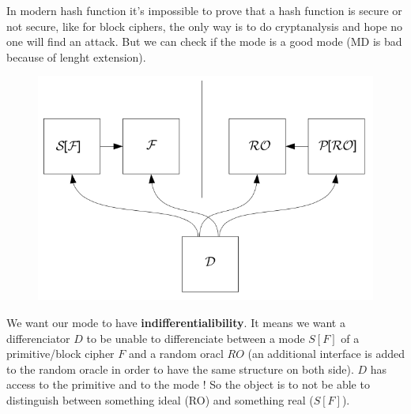 \documentclass[11pt,a4paper]{report}
\begin{document}
In modern hash function it's impossible to prove that a hash function is secure or not secure, like for block ciphers, the only way is to do cryptanalysis and hope no one will find an attack. But we can check if the mode is a good mode (MD is bad because of lenght extension).\\
\begin{figure}
\vspace{-8mm}
\includegraphics[scale=0.4]{img/img25.png}
\end{figure}
We want our mode to have \textbf{indifferentialibility}. It means we want a differenciator $D$ to be unable to differenciate between a mode $S[F]$ of a primitive/block cipher $F$ and a random oracl $RO$ (an additional interface is added to the random oracle in order to have the same structure on both side). $D$ has access to the primitive and to the mode ! So the object is to not be able to distinguish between something ideal (RO) and something real ($S[F]$).\\
\end{document}
